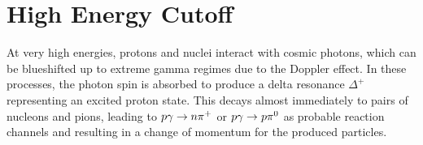 \newpage
\section{High Energy Cutoff}
\label{sec:cutoff}

At very high energies, protons and nuclei interact with cosmic photons, which can be blueshifted up to extreme gamma regimes due to
the Doppler effect. In these processes, the photon spin is absorbed to produce a delta resonance $\Delta^+$ representing an excited
proton state. This decays almost immediately to pairs of nucleons and pions, leading to $p\gamma \rightarrow \kern-0.1pt n\smash{\pi^+}$
or $p\gamma \rightarrow \kern+0.2pt p \smash{\pi^0}$ as probable reaction channels and resulting in a change of momentum for the
produced particles.

